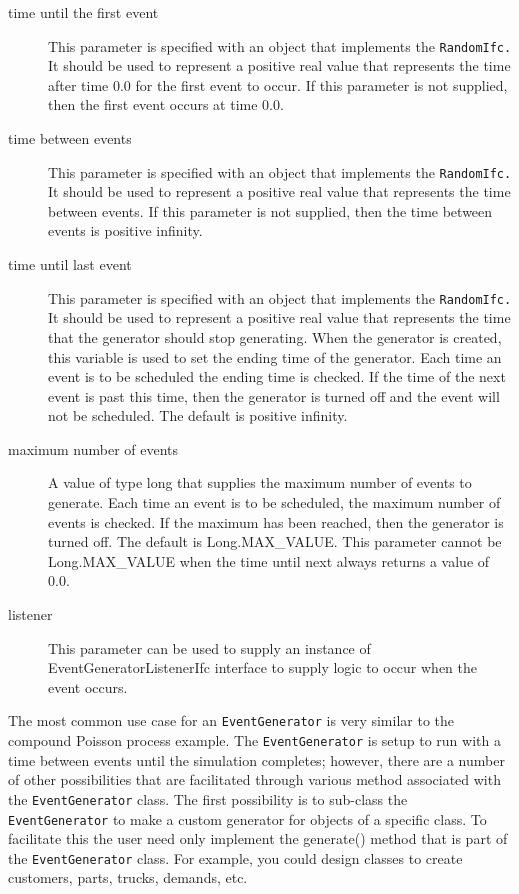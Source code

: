 \documentclass[
]{book}
\theoremstyle{definition}
\theoremstyle{definition}
\theoremstyle{definition}
\theoremstyle{definition}
\theoremstyle{remark}
\begin{document}
\begin{description}
\item[time until the first event]
This parameter is specified with an object that implements the
\texttt{RandomIfc.} It should be used to represent a positive real value that
represents the time after time 0.0 for the first event to occur. If
this parameter is not supplied, then the first event occurs at time
0.0.
\item[time between events]
This parameter is specified with an object that implements the
\texttt{RandomIfc.} It should be used to represent a positive real value that
represents the time between events. If this parameter is not
supplied, then the time between events is positive infinity.
\item[time until last event]
This parameter is specified with an object that implements the
\texttt{RandomIfc.} It should be used to represent a positive real value that
represents the time that the generator should stop generating. When
the generator is created, this variable is used to set the ending
time of the generator. Each time an event is to be scheduled the
ending time is checked. If the time of the next event is past this
time, then the generator is turned off and the event will not be
scheduled. The default is positive infinity.
\item[maximum number of events]
A value of type long that supplies the maximum number of events to
generate. Each time an event is to be scheduled, the maximum number
of events is checked. If the maximum has been reached, then the
generator is turned off. The default is Long.MAX\_VALUE. This
parameter cannot be Long.MAX\_VALUE when the time until next always
returns a value of 0.0.
\item[listener]
This parameter can be used to supply an instance of
EventGeneratorListenerIfc interface to supply logic to occur when
the event occurs.
\end{description}

The most common use case for an \texttt{EventGenerator} is very similar to the
compound Poisson process example. The \texttt{EventGenerator} is setup to run
with a time between events until the simulation completes; however,
there are a number of other possibilities that are facilitated through
various method associated with the \texttt{EventGenerator} class. The first
possibility is to sub-class the \texttt{EventGenerator} to make a custom
generator for objects of a specific class. To facilitate this the user
need only implement the generate() method that is part of the
\texttt{EventGenerator} class. For example, you could design classes to create
customers, parts, trucks, demands, etc.
\end{document}
